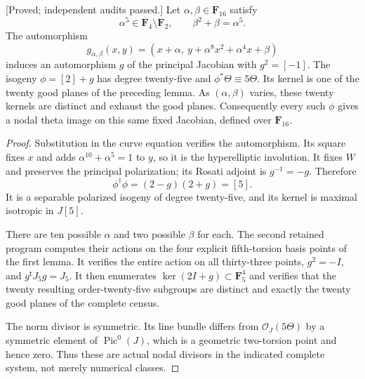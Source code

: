 \begin{proposition}
\label{prop:five-theta-twenty-self-isogenies-candidate}
\textup{[Proved; independent audits passed.]}
Let $\alpha,\beta\in\mathbf F_{16}$ satisfy
\[
        \alpha^5\in\mathbf F_4\setminus\mathbf F_2,
        \qquad \beta^2+\beta=\alpha^5.
\]
The automorphism
\[
 g_{\alpha,\beta}(x,y)
   =(x+\alpha,\ y+\alpha^8x^2+\alpha^4x+\beta)
\]
induces an automorphism $g$ of the principal Jacobian with
$g^2=[-1]$. The isogeny $\phi=[2]+g$ has degree twenty-five and
$\phi^*\Theta\equiv5\Theta$. Its kernel is one of the twenty good
planes of the preceding lemma. As $(\alpha,\beta)$ varies, these
twenty kernels are distinct and exhaust the good planes.
Consequently every such $\phi$ gives a nodal theta image on this
same fixed Jacobian, defined over $\mathbf F_{16}$.
\end{proposition}
\begin{proof}
Substitution in the curve equation verifies the automorphism.
Its square fixes $x$ and adds
$\alpha^{10}+\alpha^5=1$ to $y$, so it is the hyperelliptic
involution. It fixes $W$ and preserves the principal polarization;
its Rosati adjoint is $g^{-1}=-g$. Therefore
\[
                 \phi^\dagger\phi=(2-g)(2+g)=[5].
\]
It is a separable polarized isogeny of degree twenty-five, and its
kernel is maximal isotropic in $J[5]$.

There are ten possible $\alpha$ and two possible $\beta$ for each.
The second retained program computes their actions on the four
explicit fifth-torsion basis points of the first lemma. It verifies
the entire action on all thirty-three points, $g^2=-I$, and
$g^{\mathsf t}J_5g=J_5$. It then enumerates
$\ker(2I+g)\subset\mathbf F_5^4$ and verifies that the twenty
resulting order-twenty-five subgroups are distinct and exactly
the twenty good planes of the complete census.

The norm divisor is symmetric. Its line bundle differs from
$\mathcal O_J(5\Theta)$ by a symmetric element of $\operatorname{Pic}^0(J)$,
which is a geometric two-torsion point and hence zero. Thus these
are actual nodal divisors in the indicated complete system,
not merely numerical classes.
\end{proof}

